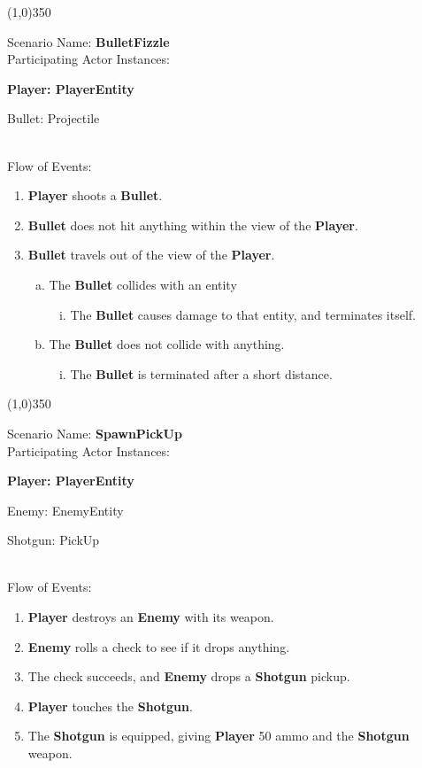 \documentclass[12pt]{article}       %
\begin{document}
\begin{center} \line(1,0){350} \end{center}
Scenario Name: {\bf BulletFizzle} \\
Participating Actor Instances:        \hspace{46pt} {\bf Player: PlayerEntity

					          \hspace{2.6 in}   Bullet: Projectile}  \vspace{10pt}  \\ 
Flow of Events: 
\begin{enumerate} 
\item {\bf Player} shoots a {\bf Bullet}.
\item {\bf Bullet} does not hit anything within the view of the {\bf Player}.
\item {\bf Bullet} travels out of the view of the {\bf Player}.
      \begin{enumerate}[a.]
       \item The {\bf Bullet} collides with an entity
                \begin{enumerate}[i.]
                \item The {\bf Bullet} causes damage to that entity, and terminates itself.
                \end{enumerate}
      \item The {\bf Bullet} does not collide with anything.
                \begin{enumerate}[i.]
                \item The {\bf Bullet} is terminated after a short distance.
                \end{enumerate}
        \end{enumerate}
\end{enumerate}

\begin{center} \line(1,0){350} \end{center}
Scenario Name: {\bf SpawnPickUp} \\
Participating Actor Instances:        \hspace{46pt} {\bf Player: PlayerEntity
	
						\hspace{2.6 in} Enemy: EnemyEntity

					          \hspace{2.6 in}  Shotgun: PickUp}  \vspace{10pt}  \\ 
Flow of Events: 
\begin{enumerate} 
\item {\bf Player} destroys an {\bf Enemy} with its weapon.
\item {\bf Enemy} rolls a check to see if it drops anything.
\item The check succeeds, and {\bf Enemy} drops a {\bf Shotgun} pickup.
\item {\bf Player} touches the {\bf Shotgun}.
\item The {\bf Shotgun} is equipped, giving {\bf Player} 50 ammo and the {\bf Shotgun} weapon.
\end{enumerate}
\end{document}

